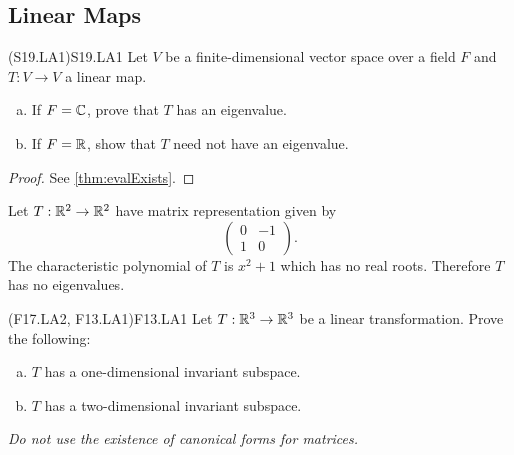 \documentclass[../../AlgebraQualSolutions.tex]{subfiles}
\begin{document}
\subsection{Linear Maps}

	\begin{prob}{(S19.LA1)}{S19.LA1}
		Let $V$ be a finite-dimensional vector space over a field $F$ and $T: V \to V$ a linear map.

		\begin{enumerate}[(a)]
			\item If $F = \mathbb{C}$, prove that $T$ has an eigenvalue.
			\item If $F = \mathbb{R}$, show that $T$ need not have an eigenvalue.
		\end{enumerate}

	\end{prob}

	\begin{proof}
		See \ref{thm:evalExists}.
	\end{proof}

	\begin{solution}
		Let $T: \mathbb{R}^2 \to \mathbb{R}^2$ have matrix representation given by 
			\[\begin{pmatrix} 0 & -1 \\ 1 & 0 \end{pmatrix}.\]
		The characteristic polynomial of $T$ is $x^2 + 1$ which has no real roots. Therefore $T$ has no eigenvalues.
	\end{solution}

	\begin{prob}{(F17.LA2, F13.LA1)}{F13.LA1}
		Let $T: \mathbb{R}^3 \to \mathbb{R}^3$ be a linear transformation. Prove the following:
		\begin{enumerate}[(a)]
			\item $T$ has a one-dimensional invariant subspace.
			\item $T$ has a two-dimensional invariant subspace.
		\end{enumerate}
	
		\emph{ Do not use the existence of canonical forms for matrices.}
	\end{prob}
\end{document}
